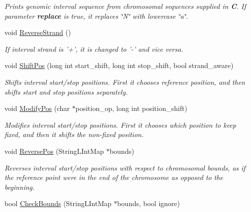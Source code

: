 \begin{CompactItemize}
\begin{CompactList}\small\item\em Prints genomic interval sequence from chromosomal sequences supplied in {\bf C}. If parameter {\bf replace} is true, it replaces \char`\"{}N\char`\"{} with lowercase \char`\"{}a\char`\"{}. \item\end{CompactList}\item 
\hypertarget{classGenomicInterval_a410816fa04d76edd7caeb9ae2442ae1}{
void \hyperlink{classGenomicInterval_a410816fa04d76edd7caeb9ae2442ae1}{ReverseStrand} ()}
\label{classGenomicInterval_a410816fa04d76edd7caeb9ae2442ae1}

\begin{CompactList}\small\item\em If interval strand is '+', it is changed to '-' and vice versa. \item\end{CompactList}\item 
void \hyperlink{classGenomicInterval_ac9a744d5ecd181d6ddc9b7e47605a59}{ShiftPos} (long int start\_\-shift, long int stop\_\-shift, bool strand\_\-aware)
\begin{CompactList}\small\item\em Shifts interval start/stop positions. First it chooses reference position, and then shifts start and stop positions separately. \item\end{CompactList}\item 
void \hyperlink{classGenomicInterval_96b34b76019001c4751d4c4f868ee24d}{ModifyPos} (char $\ast$position\_\-op, long int position\_\-shift)
\begin{CompactList}\small\item\em Modifies interval start/stop positions. First it chooses which position to keep fixed, and then it shifts the non-fixed position. \item\end{CompactList}\item 
\hypertarget{classGenomicInterval_bf416450f25b579dfb76b2bd6a81aa6a}{
void \hyperlink{classGenomicInterval_bf416450f25b579dfb76b2bd6a81aa6a}{ReversePos} (StringLIntMap $\ast$bounds)}
\label{classGenomicInterval_bf416450f25b579dfb76b2bd6a81aa6a}

\begin{CompactList}\small\item\em Reverses interval start/stop positions with respect to chromosomal bounds, as if the reference point were in the end of the chromosome as opposed to the beginning. \item\end{CompactList}\item 
\hypertarget{classGenomicInterval_1834c0f1217585398de74119d680ab7b}{
bool \hyperlink{classGenomicInterval_1834c0f1217585398de74119d680ab7b}{CheckBounds} (StringLIntMap $\ast$bounds, bool ignore)}
\label{classGenomicInterval_1834c0f1217585398de74119d680ab7b}


\end{CompactItemize}
